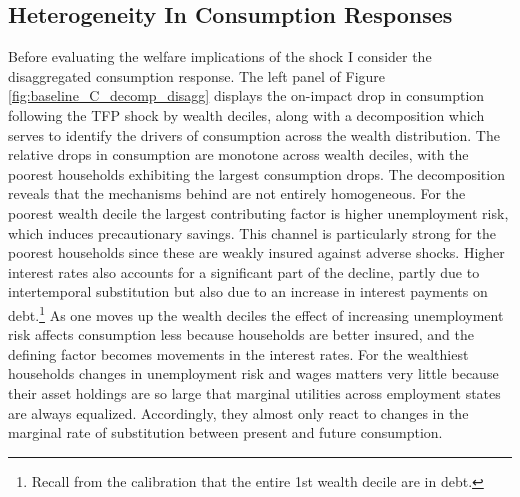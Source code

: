 \subsection{Heterogeneity In Consumption Responses } %
Before evaluating the welfare implications of the shock I consider the disaggregated consumption response. The left panel of Figure \ref{fig:baseline_C_decomp_disagg} displays the on-impact drop in consumption following the TFP shock by wealth deciles, along with a decomposition which serves to identify the drivers of consumption across the wealth distribution. The relative drops in consumption are monotone across wealth deciles, with the poorest households exhibiting the largest consumption drops. 
The decomposition reveals that the mechanisms behind are not entirely homogeneous. For the poorest wealth decile the largest contributing factor is higher unemployment risk, which induces precautionary savings. This channel is particularly strong for the poorest households since these are weakly insured against adverse shocks. Higher interest rates also accounts for a significant part of the decline, partly due to intertemporal substitution but also due to an increase in interest payments on debt.\footnote{Recall from the calibration that the entire 1st wealth decile are in debt.} 
As one moves up the wealth deciles the effect of increasing unemployment risk affects consumption less because households are better insured, and the defining factor becomes movements in the interest rates. 
For the wealthiest households changes in unemployment risk and wages matters very little because their asset holdings are so large that marginal utilities across employment states are always equalized. Accordingly, they almost only react to changes in the marginal rate of substitution between present and future consumption.  


